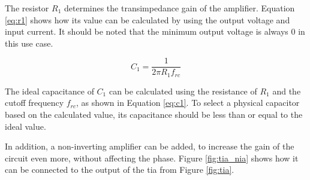 The resistor $R_1$ determines the transimpedance gain of the amplifier. Equation \eqref{eq:r1} shows how its value can be calculated by using the output voltage and input current. It should be noted that the minimum output voltage is always 0 in this use case.

\begin{equation}\label{eq:c1}
	C_1 = \frac{1}{2 \pi R_1 f_{rc}}
\end{equation}

The ideal capacitance of $C_1$ can be calculated using the resistance of $R_1$ and the cutoff frequency $f_{rc}$, as shown in Equation \eqref{eq:c1}. To select a physical capacitor based on the calculated value, its capacitance should be less than or equal to the ideal value.


In addition, a non-inverting amplifier can be added, to increase the gain of the circuit even more, without affecting the phase. Figure \ref{fig:tia_nia} shows how it can be connected to the output of the \gls{tia} from Figure \ref{fig:tia}.

